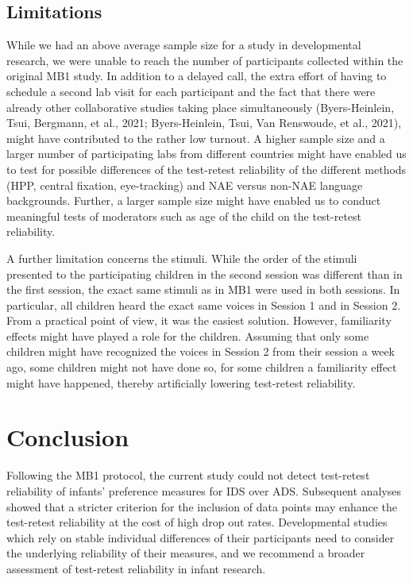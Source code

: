 \documentclass[
  english,
  man,floatsintext]{apa6}
\begin{document}
\hypertarget{limitations}{%
\subsection{Limitations}\label{limitations}}

While we had an above average sample size for a study in developmental research, we were unable to reach the number of participants collected within the original MB1 study. In addition to a delayed call, the extra effort of having to schedule a second lab visit for each participant and the fact that there were already other collaborative studies taking place simultaneously (Byers-Heinlein, Tsui, Bergmann, et al., 2021; Byers-Heinlein, Tsui, Van Renswoude, et al., 2021), might have contributed to the rather low turnout. A higher sample size and a larger number of participating labs from different countries might have enabled us to test for possible differences of the test-retest reliability of the different methods (HPP, central fixation, eye-tracking) and NAE versus non-NAE language backgrounds. Further, a larger sample size might have enabled us to conduct meaningful tests of moderators such as age of the child on the test-retest reliability.

A further limitation concerns the stimuli. While the order of the stimuli presented to the participating children in the second session was different than in the first session, the exact same stimuli as in MB1 were used in both sessions. In particular, all children heard the exact same voices in Session 1 and in Session 2. From a practical point of view, it was the easiest solution. However, familiarity effects might have played a role for the children. Assuming that only some children might have recognized the voices in Session 2 from their session a week ago, some children might not have done so, for some children a familiarity effect might have happened, thereby artificially lowering test-retest reliability.

\hypertarget{conclusion}{%
\section{Conclusion}\label{conclusion}}

Following the MB1 protocol, the current study could not detect test-retest reliability of infants' preference measures for IDS over ADS. Subsequent analyses showed that a stricter criterion for the inclusion of data points may enhance the test-retest reliability at the cost of high drop out rates. Developmental studies which rely on stable individual differences of their participants need to consider the underlying reliability of their measures, and we recommend a broader assessment of test-retest reliability in infant research.
\end{document}
